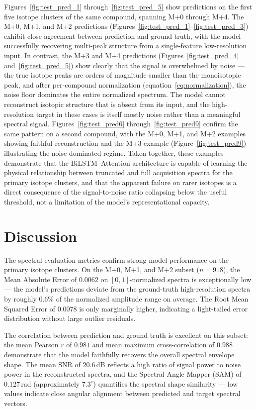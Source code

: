 \documentclass[12pt,a4paper]{report}
\begin{document}
Figures~\ref{fig:test_pred_1} through~\ref{fig:test_pred_5} show predictions on the first five isotope clusters of the same compound, spanning M+0 through M+4.  The M+0, M+1, and M+2 predictions (Figures~\ref{fig:test_pred_1}--\ref{fig:test_pred_3}) exhibit close agreement between prediction and ground truth, with the model successfully recovering multi-peak structure from a single-feature low-resolution input.  In contrast, the M+3 and M+4 predictions (Figures~\ref{fig:test_pred_4} and~\ref{fig:test_pred_5}) show clearly that the signal is overwhelmed by noise — the true isotope peaks are orders of magnitude smaller than the monoisotopic peak, and after per-compound normalization (equation~\ref{eq:normalization}), the noise floor dominates the entire normalized spectrum.  The model cannot reconstruct isotopic structure that is absent from its input, and the high-resolution target in these cases is itself mostly noise rather than a meaningful spectral signal.  Figures~\ref{fig:test_pred6} through~\ref{fig:test_pred9} confirm the same pattern on a second compound, with the M+0, M+1, and M+2 examples showing faithful reconstruction and the M+3 example (Figure~\ref{fig:test_pred9}) illustrating the noise-dominated regime.  Taken together, these examples demonstrate that the BiLSTM--Attention architecture is capable of learning the physical relationship between truncated and full acquisition spectra for the primary isotope clusters, and that the apparent failure on rarer isotopes is a direct consequence of the signal-to-noise ratio collapsing below the useful threshold, not a limitation of the model's representational capacity.

\section{Discussion}

The spectral evaluation metrics confirm strong model performance on the primary isotope clusters.  On the M+0, M+1, and M+2 subset ($n = 918$), the Mean Absolute Error of $0.0062$ on $[0,1]$-normalized spectra is exceptionally low — the model's predictions deviate from the ground-truth high-resolution spectra by roughly $0.6\%$ of the normalized amplitude range on average.  The Root Mean Squared Error of $0.0078$ is only marginally higher, indicating a light-tailed error distribution without large outlier residuals.

The correlation between prediction and ground truth is excellent on this subset: the mean Pearson $r$ of $0.981$ and mean maximum cross-correlation of $0.988$ demonstrate that the model faithfully recovers the overall spectral envelope shape.  The mean SNR of $20.6\,$dB reflects a high ratio of signal power to noise power in the reconstructed spectra, and the Spectral Angle Mapper (SAM) of $0.127\,$rad (approximately $7.3^{\circ}$) quantifies the spectral shape similarity — low values indicate close angular alignment between predicted and target spectral vectors.
\end{document}

